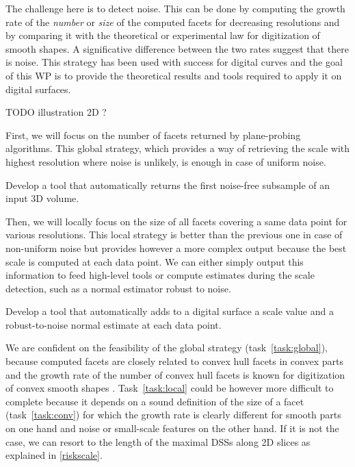 The challenge here is to detect noise. This can be done by computing the growth rate of the
\emph{number} or \emph{size} of the computed facets for decreasing resolutions
and by comparing it with the theoretical or experimental law for digitization of smooth shapes.
A significative difference between the two rates suggest that there is noise.
This strategy has been used with success for digital curves \cite{Kerautret2012}
and the goal of this WP is to provide the theoretical results and tools required to apply it on digital surfaces. 

TODO illustration 2D ?

First, we will focus on the number of facets returned by plane-probing algorithms.
This global strategy, which provides a way of retrieving the scale with highest resolution
where noise is unlikely, is enough in case of uniform noise. 

\begin{Task}
  \label{task:global}
  Develop a tool that automatically returns the first noise-free subsample of an input 3D volume.
\end{Task}

Then, we will locally focus on the size of all facets covering a same data point for various resolutions. 
This local strategy is better than the previous one in case of non-uniform noise but provides however
a more complex output because the best scale is computed at each data point.
We can either simply output this information to feed high-level tools or compute estimates during
the scale detection, such as a normal estimator robust to noise.  

\begin{Task}
  \label{task:local}
  Develop a tool that automatically adds to a digital surface a scale value and
  a robust-to-noise normal estimate at each data point. 
\end{Task}

\Risks
We are confident on the feasibility of the global strategy (task~\ref{task:global}),
because computed facets are closely related to convex hull facets in convex parts
and the growth rate of the number of convex hull facets is known for digitization
of convex smooth shapes \cite{Barany1998}. 
Task~\ref{task:local} could be however more difficult to complete
because it depends on a sound definition of the size of a facet (task~\ref{task:conv})
for which the growth rate is clearly different for smooth parts on one hand
and noise or small-scale features on the other hand. If it is not the case, we can
resort to the length of the maximal DSSs along 2D slices as explained in \ref{riskscale}.

